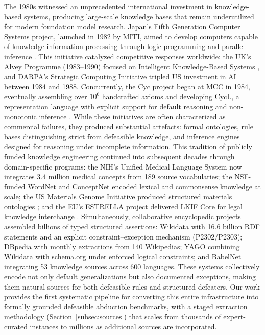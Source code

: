\documentclass{article}
\theoremstyle{definition}
\begin{document}
The 1980s witnessed an unprecedented international investment in knowledge-based systems, producing large-scale knowledge bases that remain underutilized for modern foundation model research. Japan's Fifth Generation Computer Systems project, launched in 1982 by MITI, aimed to develop computers capable of knowledge information processing through logic programming and parallel inference \cite{fuchi1984aiming, feigenbaum1993fgcs}. This initiative catalyzed competitive responses worldwide: the UK's Alvey Programme (1983--1990) focused on Intelligent Knowledge-Based Systems \cite{alvey1985ikbs}, and DARPA's Strategic Computing Initiative tripled US investment in AI between 1984 and 1988. Concurrently, the Cyc project began at MCC in 1984, eventually assembling over $10^6$ handcrafted axioms and developing CycL, a representation language with explicit support for default reasoning and non-monotonic inference \cite{lenat1990cyc, lenat1995cyc}. While these initiatives are often characterized as commercial failures, they produced substantial artefacts: formal ontologies, rule bases distinguishing strict from defeasible knowledge, and inference engines designed for reasoning under incomplete information. This tradition of publicly funded knowledge engineering continued into subsequent decades through domain-specific programs: the NIH's Unified Medical Language System \cite{lindberg1993umls} now integrates 3.4 million medical concepts from 189 source vocabularies; the NSF-funded WordNet \cite{miller1995wordnet} and ConceptNet \cite{speer2017conceptnet} encoded lexical and commonsense knowledge at scale; the US Materials Genome Initiative produced structured materials ontologies \cite{matonto2015}; and the EU's ESTRELLA project delivered LKIF Core for legal knowledge interchange \cite{lkif2007}. Simultaneously, collaborative encyclopedic projects assembled billions of typed structured assertions: Wikidata \cite{vrandecic2014wikidata} with 16.6 billion RDF statements and an explicit constraint--exception mechanism (P2302/P2303); DBpedia \cite{lehmann2015dbpedia} with monthly extractions from 140 Wikipedias; YAGO \cite{suchanek2024yago} combining Wikidata with schema.org under enforced logical constraints; and BabelNet \cite{navigli2012babelnet} integrating 53 knowledge sources across 600 languages. These systems collectively encode not only default generalizations but also documented exceptions, making them natural sources for both defeasible rules and structured defeaters. Our work provides the first systematic pipeline for converting this entire infrastructure into formally grounded defeasible abduction benchmarks, with a staged extraction methodology (Section~\ref{subsec:sources}) that scales from thousands of expert-curated instances to millions as additional sources are incorporated.
\end{document}
